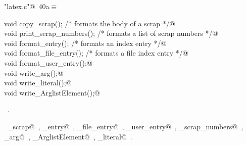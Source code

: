 \documentclass[a4paper]{report}
\begin{document}
\begin{flushleft} \small
\begin{minipage}{\linewidth}\label{scrap72}\raggedright\small
{} \verb@"latex.c"@\nobreak\ {\footnotesize {40a}}$\equiv$
\vspace{-1ex}
\begin{list}{}{} \item
\mbox{}\verb@static void copy_scrap();             /* formats the body of a scrap */@\\
\mbox{}\verb@static void print_scrap_numbers();      /* formats a list of scrap numbers */@\\
\mbox{}\verb@static void format_entry();             /* formats an index entry */@\\
\mbox{}\verb@static void format_file_entry();        /* formats a file index entry */@\\
\mbox{}\verb@static void format_user_entry();@\\
\mbox{}\verb@static void write_arg();@\\
\mbox{}\verb@static void write_literal();@\\
\mbox{}\verb@static void write_ArglistElement();@\\
\mbox{}\verb@@{\NWsep}
\end{list}
\vspace{-1.5ex}
\footnotesize
\begin{list}{}{\setlength{\itemsep}{-\parsep}\setlength{\itemindent}{-\leftmargin}}
\item \NWtxtFileDefBy\ .
\item \NWtxtIdentsUsed\nobreak\  \verb@copy_scrap@\nobreak\ , \verb@format_entry@\nobreak\ , \verb@format_file_entry@\nobreak\ , \verb@format_user_entry@\nobreak\ , \verb@print_scrap_numbers@\nobreak\ , \verb@write_arg@\nobreak\ , \verb@write_ArglistElement@\nobreak\ , \verb@write_literal@\nobreak\ .
\item{}
\end{list}
\end{minipage}\vspace{4ex}
\end{flushleft}
\end{document}

